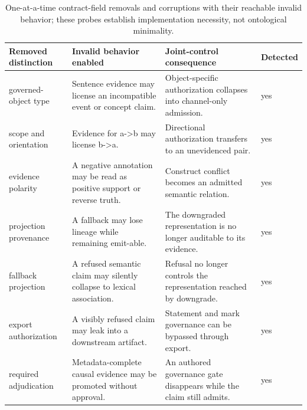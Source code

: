 \begin{table}[t]
  \caption{One-at-a-time contract-field removals and corruptions with their reachable invalid behavior; these probes establish implementation necessity, not ontological minimality.}
  \label{tab:contract-field-necessity}
  \centering
  \scriptsize
  \begin{tabular}{@{}p{}p{}p{}p{}@{}}
    \toprule
    Removed distinction & Invalid behavior enabled & Joint-control consequence & Detected \\
    \midrule
    governed-object type & Sentence evidence may license an incompatible event or concept claim. & Object-specific authorization collapses into channel-only admission. & yes \\
    scope and orientation & Evidence for a->b may license b->a. & Directional authorization transfers to an unevidenced pair. & yes \\
    evidence polarity & A negative annotation may be read as positive support or reverse truth. & Construct conflict becomes an admitted semantic relation. & yes \\
    projection provenance & A fallback may lose lineage while remaining emit-able. & The downgraded representation is no longer auditable to its evidence. & yes \\
    fallback projection & A refused semantic claim may silently collapse to lexical association. & Refusal no longer controls the representation reached by downgrade. & yes \\
    export authorization & A visibly refused claim may leak into a downstream artifact. & Statement and mark governance can be bypassed through export. & yes \\
    required adjudication & Metadata-complete causal evidence may be promoted without approval. & An authored governance gate disappears while the claim still admits. & yes \\
    \bottomrule
  \end{tabular}
\end{table}

